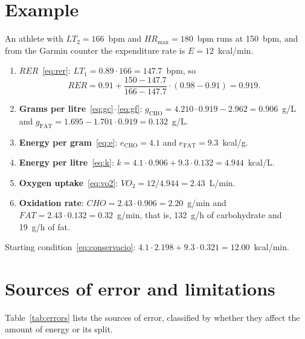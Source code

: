 \documentclass[10pt,a4paper]{article}
\newcommand{\sub}[1]{{\scriptscriptstyle\mathrm{#1}}}   %
\newcommand{\CHO}{\sub{CHO}}
\newcommand{\FAT}{\sub{FAT}}
\newcommand{\smax}{{\scriptscriptstyle\text{max}}}
\newcommand{\cho}{\ensuremath{\mathit{CHO}}}               %
\newcommand{\fat}{\ensuremath{\mathit{FAT}}}
\newcommand{\VO}{\ensuremath{\mathit{VO}_2}}               %
\newcommand{\RER}{\ensuremath{\mathit{RER}}}
\newcommand{\FCmax}{\ensuremath{\mathit{HR}_{\smax}}}
\begin{document}
\section{Example}\label{sec:exemple}

An athlete with $LT_2=166$~bpm and $\FCmax=180$~bpm runs at 150~bpm, and from the Garmin
counter the expenditure rate is $E=12$~kcal/min.
\begin{enumerate}
  \item \textbf{\RER}~\eqref{eq:rer}: $LT_1=0.89\cdot166=147.7$~bpm, so
        \[
          \RER=0.91+\frac{150-147.7}{166-147.7}\cdot(0.98-0.91)=0.919 .
        \]
  \item \textbf{Grams per litre}~\eqref{eq:gc}--\eqref{eq:gf}:
        $g_{\CHO}=4.210\cdot0.919-2.962=0.906$~g/L and
        $g_{\FAT}=1.695-1.701\cdot0.919=0.132$~g/L.
  \item \textbf{Energy per gram}~\eqref{eq:e}: $e_{\CHO}=4.1$ and $e_{\FAT}=9.3$~kcal/g.
  \item \textbf{Energy per litre}~\eqref{eq:k}:
        $k=4.1\cdot0.906+9.3\cdot0.132=4.944$~kcal/L.
  \item \textbf{Oxygen uptake}~\eqref{eq:vo2}: $\VO=12/4.944=2.43$~L/min.
  \item \textbf{Oxidation rate}: $\cho=2.43\cdot0.906=2.20$~g/min
        and $\fat=2.43\cdot0.132=0.32$~g/min, that is, 132~g/h of carbohydrate and
        19~g/h of fat.
\end{enumerate}
Starting condition~\eqref{eq:conservacio}: $4.1\cdot2.198+9.3\cdot0.321=12.00$~kcal/min.

\section{Sources of error and limitations}\label{sec:limitacions}

Table~\ref{tab:errors} lists the sources of error, classified by whether they affect the
amount of energy or its split.
\end{document}
